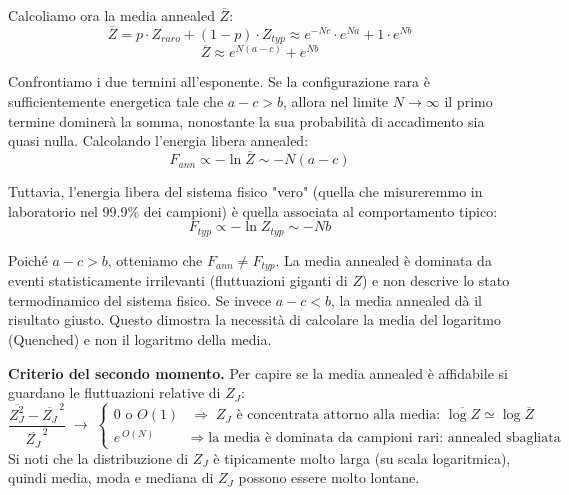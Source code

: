 Calcoliamo ora la media annealed $\overline{Z}$:
\begin{equation}
    \overline{Z} = p \cdot Z_{raro} + (1-p) \cdot Z_{typ} \approx e^{-Nc} \cdot e^{Na} + 1 \cdot e^{Nb}
\end{equation}
\begin{equation}
    \overline{Z} \approx e^{N(a-c)} + e^{Nb}
\end{equation}

Confrontiamo i due termini all'esponente. Se la configurazione rara è sufficientemente energetica tale che $a - c > b$, allora nel limite $N \to \infty$ il primo termine dominerà la somma, nonostante la sua probabilità di accadimento sia quasi nulla.
Calcolando l'energia libera annealed:
\begin{equation}
    F_{ann} \propto -\ln \overline{Z} \sim -N(a-c)
\end{equation}

Tuttavia, l'energia libera del sistema fisico "vero" (quella che misureremmo in laboratorio nel 99.9\% dei campioni) è quella associata al comportamento tipico:
\begin{equation}
    F_{typ} \propto -\ln Z_{typ} \sim -Nb
\end{equation}

Poiché $a-c > b$, otteniamo che $F_{ann} \neq F_{typ}$. La media annealed è dominata da eventi statisticamente irrilevanti (fluttuazioni giganti di $Z$) e non descrive lo stato termodinamico del sistema fisico. Se invece $a - c < b$, la media annealed dà il risultato giusto.
Questo dimostra la necessità di calcolare la media del logaritmo (Quenched) e non il logaritmo della media.

\noindent\textbf{Criterio del secondo momento.} Per capire se la media annealed è affidabile si guardano le fluttuazioni relative di $Z_J$:
\begin{equation}
\frac{\overline{Z_J^2} - \overline{Z_J}^{\,2}}{\overline{Z_J}^{\,2}} \;\to\;
\begin{cases}
0 \text{ o } O(1) & \Rightarrow \; Z_J \text{ è concentrata attorno alla media: } \overline{\log Z} \simeq \log \overline{Z} \\
e^{\,O(N)} & \Rightarrow \; \text{la media è dominata da campioni rari: annealed sbagliata}
\end{cases}
\end{equation}
Si noti che la distribuzione di $Z_J$ è tipicamente molto larga (su scala logaritmica), quindi media, moda e mediana di $Z_J$ possono essere molto lontane.


